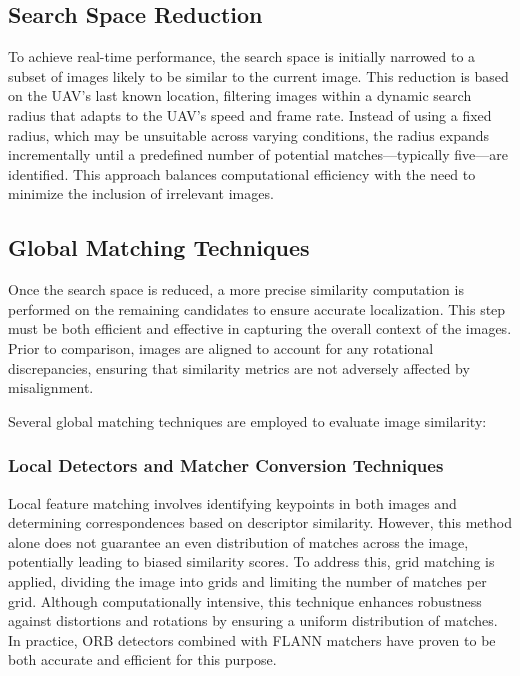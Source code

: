 \subsection{Search Space Reduction}

To achieve real-time performance, the search space is initially narrowed to a subset of images likely to be similar to the current image. This reduction is based on the UAV's last known location, filtering images within a dynamic search radius that adapts to the UAV's speed and frame rate. Instead of using a fixed radius, which may be unsuitable across varying conditions, the radius expands incrementally until a predefined number of potential matches—typically five—are identified. This approach balances computational efficiency with the need to minimize the inclusion of irrelevant images.

\subsection{Global Matching Techniques}

Once the search space is reduced, a more precise similarity computation is performed on the remaining candidates to ensure accurate localization. This step must be both efficient and effective in capturing the overall context of the images. Prior to comparison, images are aligned to account for any rotational discrepancies, ensuring that similarity metrics are not adversely affected by misalignment.

Several global matching techniques are employed to evaluate image similarity:

\subsubsection{Local Detectors and Matcher Conversion Techniques}

Local feature matching involves identifying keypoints in both images and determining correspondences based on descriptor similarity. However, this method alone does not guarantee an even distribution of matches across the image, potentially leading to biased similarity scores. To address this, grid matching is applied, dividing the image into grids and limiting the number of matches per grid. Although computationally intensive, this technique enhances robustness against distortions and rotations by ensuring a uniform distribution of matches. In practice, ORB detectors combined with FLANN matchers have proven to be both accurate and efficient for this purpose.

